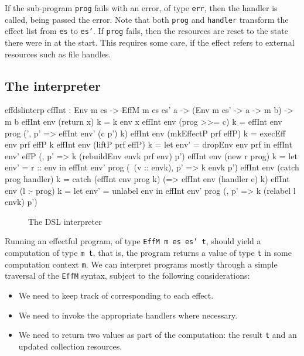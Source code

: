 \noindent
If the sub-program \texttt{prog} fails with an error, of type \texttt{err}, then
the handler is called, being passed the error. Note that both \texttt{prog}
and \texttt{handler} transform the effect list from \texttt{es} to \texttt{es'}.
If \texttt{prog} fails, then the resources are reset to the state there were in
at the start. This requires some care, if the effect refers to external
resources such as file handles.

\subsection{The \Eff{} interpreter}

\begin{SaveVerbatim}{effdslinterp}
effInt : Env m es -> EffM m es es' a -> (Env m es' -> a -> m b) -> m b
effInt env (return x) k = k env x
effInt env (prog >>= c) k = effInt env prog (\env', p' => effInt env' (c p') k)
effInt env (mkEffectP prf effP) k = execEff env prf effP k
effInt env (liftP prf effP) k = let env' = dropEnv env prf in 
                                    effInt env' effP (\envk, p' => k (rebuildEnv envk prf env) p')
effInt env (new r prog) k = let env' = r :: env in 
                                effInt env' prog (\ (v :: envk), p' => k envk p')
effInt env (catch prog handler) k = catch (effInt env prog k)
                                          (\e => effInt env (handler e) k)
effInt env (l :- prog) k = let env' = unlabel env in
                                      effInt env' prog (\envk, p' => k (relabel l envk) p')
\end{SaveVerbatim}

\begin{figure*}[t]
\begin{center}
\end{center}
\caption{The \Eff{} DSL interpreter}
\label{effdslimp}
\end{figure*}

Running an effectful program, of type \texttt{EffM m es es' t}, should yield
a computation of type \texttt{m t}, that is, the program returns a value of type
\texttt{t} in some computation context \texttt{m}. We can interpret programs
mostly through a simple traversal of the \texttt{EffM} syntax, subject to the
following considerations:

\begin{itemize}
\item We need to keep track of  corresponding to each effect.
\item We need to invoke the appropriate handlers where necessary.
\item We need to return two values as part of the computation: the result
\texttt{t} and an updated collection resources.
\end{itemize}

